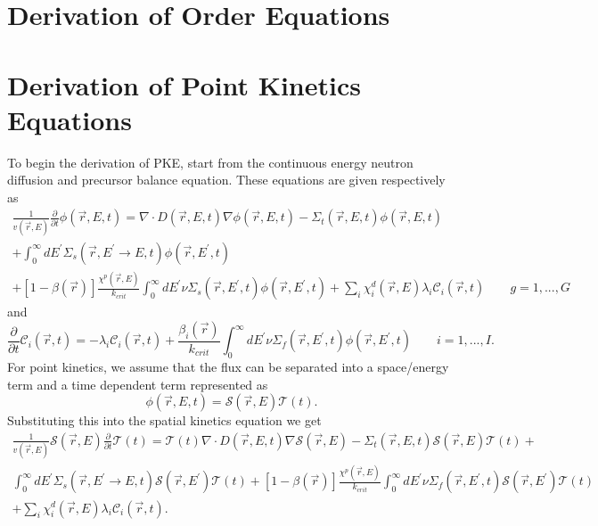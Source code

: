 \documentclass{ansconf}
\numberwithin{equation}{section}
\begin{document}
\section{Derivation of Order Equations}\label{app:order}

\section{Derivation of Point Kinetics Equations} \label{app:pkes}

To begin the derivation of PKE, start from the continuous energy neutron diffusion and precursor balance equation. These equations are given respectively as
\begin{multline}
\frac{1}{v\left(\vec{r},E\right)}\frac{\partial}{\partial t}\phi\left(\vec{r},E,t\right)=\nabla\cdot D\left(\vec{r},E,t\right)\nabla\phi\left(\vec{r},E,t\right)-
\Sigma_{t}\left(\vec{r},E,t\right)\phi\left(\vec{r},E,t\right)\\ 
+\int_{0}^{\infty}dE^{\prime}\Sigma_{s}\left(\vec{r},E^{\prime}
\rightarrow E,t\right)\phi\left(\vec{r},E^{\prime},t\right)\\ 
+\left[1-\beta\left(\vec{r}\right)\right]
\frac{\chi^{p}\left(\vec{r},E\right)}{k_{crit}}\int_{0}^{\infty}dE^{\prime}\nu\Sigma_{s}
\left(\vec{r},E^{\prime},t\right)
\phi\left(\vec{r},E^{\prime},t\right)+
\sum_{i}\chi_{i}^{d}\left(\vec{r},E\right)
\lambda_{i}\mathcal{C}_{i}\left(\vec{r},t\right)\qquad g=1,...,G
\end{multline}
and
\begin{equation}
\frac{\partial}{\partial t}\mathcal{C}_{i}\left(\vec{r},t\right)=-\lambda_{i}\mathcal{C}_{i}\left(\vec{r},t\right)+\frac{\beta_{i}\left(\vec{r}\right)}{k_{crit}}\int_{0}^{\infty}dE^{\prime}\nu\Sigma_{f}\left(\vec{r},E^{\prime},t\right)\phi\left(\vec{r},E^{\prime},t\right)\qquad i=1,...,I.
\end{equation}
For point kinetics, we assume that the flux can be separated into a space/energy term and a time dependent term represented as 
\begin{equation}
\phi\left(\vec{r},E,t\right)=\mathcal{S}\left(\vec{r},E\right)
\mathcal{T}\left(t\right).
\end{equation}
 Substituting this into the spatial kinetics equation we get
\begin{multline}
\frac{1}{v\left(\vec{r},E\right)}\mathcal{S}\left(\vec{r},E\right)\frac{\partial}{\partial t}\mathcal{T}\left(t\right)=\mathcal{T}\left(t\right)\nabla\cdot D\left(\vec{r},E,t\right)\nabla\mathcal{S}\left(\vec{r},E\right)-\Sigma_{t}\left(\vec{r},E,t\right)\mathcal{S}\left(\vec{r},E\right)\mathcal{T}\left(t\right)+\\
\int_{0}^{\infty}dE^{\prime}\Sigma_{s}\left(\vec{r},E^{\prime}\rightarrow E,t\right)\mathcal{S}\left(\vec{r},E^{\prime}\right)\mathcal{T}\left(t\right)+\left[1-\beta\left(\vec{r}\right)\right]\frac{\chi^{p}\left(\vec{r},E\right)}{k_{crit}}\int_{0}^{\infty}dE^{\prime}\nu\Sigma_{f}\left(\vec{r},E^{\prime},t\right)\mathcal{S}\left(\vec{r},E^{\prime}\right)\mathcal{T}\left(t\right)\\
+\sum_{i}\chi_{i}^{d}\left(\vec{r},E\right)\lambda_{i}\mathcal{C}_{i}\left(\vec{r},t\right).
\end{multline}
\end{document}

